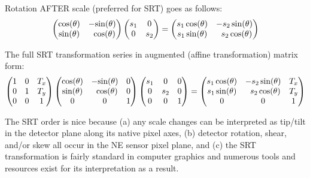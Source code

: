 \documentclass{article}
\begin{document}
Rotation AFTER scale (preferred for SRT) goes as follows:
\begin{align*}
   \begin{pmatrix}
      \mathrm{cos}(\theta)   &    -\mathrm{sin}(\theta)   \\
      \mathrm{sin}(\theta)   & \;\;\mathrm{cos}(\theta) 
   \end{pmatrix}
   \begin{pmatrix}
         s_1 &  0   \\
         0   & s_2 
   \end{pmatrix}
   =
   \begin{pmatrix}
      s_1 \, \mathrm{cos}(\theta)   &     -s_2 \, \mathrm{sin}(\theta)   \\
      s_1 \, \mathrm{sin}(\theta)   & \;\; s_2 \, \mathrm{cos}(\theta) 
   \end{pmatrix}
\end{align*}

The full SRT transformation series in augmented (affine
transformation) matrix form:
\begin{align*}
   \begin{pmatrix}
      1 & 0 & T_x \\
      0 & 1 & T_y \\
      0 & 0 & 1
   \end{pmatrix}
   \begin{pmatrix}
      \mathrm{cos}(\theta)   &    -\mathrm{sin}(\theta) & 0  \\
      \mathrm{sin}(\theta)   & \;\;\mathrm{cos}(\theta) & 0  \\
           0   &          0 & 1
   \end{pmatrix}
   \begin{pmatrix}
      s_1 &   0  & 0  \\
        0 & s_2  & 0  \\
        0 &   0  & 1 
   \end{pmatrix}
   =
   \begin{pmatrix}
      s_1 \, \mathrm{cos}(\theta)   &     -s_2 \, \mathrm{sin}(\theta)  & T_x \\
      s_1 \, \mathrm{sin}(\theta)   & \;\; s_2 \, \mathrm{cos}(\theta)  & T_y \\
                  0   &                  0  &   1
   \end{pmatrix}
\end{align*}

The SRT order is nice because (a) any scale changes can be interpreted as
tip/tilt in the detector plane along its native pixel axes, (b) detector
rotation, shear, and/or skew all occur in the NE sensor pixel plane, and 
(c) the SRT transformation is fairly standard in computer graphics and
numerous tools and resources exist for its interpretation as a result.\\
\end{document}
